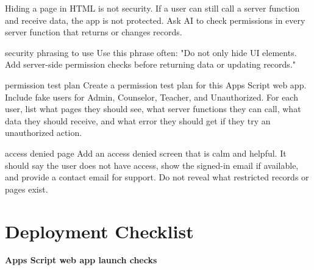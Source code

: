 \documentclass[10pt]{article}
\newcommand{\sectionkicker}[1]{\vspace{0.2em}{\small\bfseries\color{GCTeal}#1}\vspace{-0.15em}}
\newcommand{\tighttitle}[1]{{\Large\bfseries\color{GCNavy}#1}\par}
\begin{document}
Hiding a page in HTML is not security. If a user can still call a server function and receive data, the app is not protected. Ask AI to check permissions in every server function that returns or changes records.

\begin{safetybox}{security phrasing to use}
Use this phrase often: "Do not only hide UI elements. Add server-side permission checks before returning data or updating records."
\end{safetybox}

\begin{promptbox}{permission test plan}
Create a permission test plan for this Apps Script web app. Include fake users for Admin, Counselor, Teacher, and Unauthorized. For each user, list what pages they should see, what server functions they can call, what data they should receive, and what error they should get if they try an unauthorized action.
\end{promptbox}

\begin{promptbox}{access denied page}
Add an access denied screen that is calm and helpful. It should say the user does not have access, show the signed-in email if available, and provide a contact email for support. Do not reveal what restricted records or pages exist.
\end{promptbox}

\section{Deployment Checklist}
\sectionkicker{BEFORE YOU SHARE THE LINK}
\tighttitle{Apps Script web app launch checks}
\end{document}
